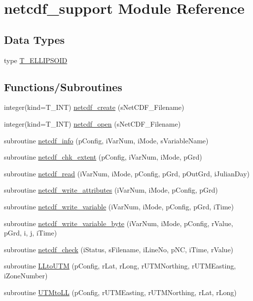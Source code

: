 \hypertarget{namespacenetcdf__support}{
\section{netcdf\_\-support Module Reference}
\label{namespacenetcdf__support}
}
\subsection*{Data Types}
\begin{DoxyCompactItemize}
\item 
type \hyperlink{typenetcdf__support_1_1_t___e_l_l_i_p_s_o_i_d}{T\_\-ELLIPSOID}
\end{DoxyCompactItemize}
\subsection*{Functions/Subroutines}
\begin{DoxyCompactItemize}
\item 
integer(kind=T\_\-INT) \hyperlink{namespacenetcdf__support_a9391bb174b4eadf498d9010f483b0f48}{netcdf\_\-create} (sNetCDF\_\-Filename)
\item 
integer(kind=T\_\-INT) \hyperlink{namespacenetcdf__support_a6eeec6c2df01a48a69ecbafb53b679d7}{netcdf\_\-open} (sNetCDF\_\-Filename)
\item 
subroutine \hyperlink{namespacenetcdf__support_aa89f8e8af31edb7d9f5c0ef77ef23768}{netcdf\_\-info} (pConfig, iVarNum, iMode, sVariableName)
\item 
subroutine \hyperlink{namespacenetcdf__support_adeaa2a22708c9c7348a906103ce38f34}{netcdf\_\-chk\_\-extent} (pConfig, iVarNum, iMode, pGrd)
\item 
subroutine \hyperlink{namespacenetcdf__support_afc78353319d2b16dc631863502467fd6}{netcdf\_\-read} (iVarNum, iMode, pConfig, pGrd, pOutGrd, iJulianDay)
\item 
subroutine \hyperlink{namespacenetcdf__support_aa64a311997b05e100af097459b0e757f}{netcdf\_\-write\_\-attributes} (iVarNum, iMode, pConfig, pGrd)
\item 
subroutine \hyperlink{namespacenetcdf__support_a8a7d46a6ddcdafb7d81472c7dbe3b231}{netcdf\_\-write\_\-variable} (iVarNum, iMode, pConfig, pGrd, iTime)
\item 
subroutine \hyperlink{namespacenetcdf__support_aea9ea475d261fc0de8af0a3d58111d4c}{netcdf\_\-write\_\-variable\_\-byte} (iVarNum, iMode, pConfig, rValue, pGrd, i, j, iTime)
\item 
subroutine \hyperlink{namespacenetcdf__support_a0d68b435588c00e7f5662b237c9bc4bc}{netcdf\_\-check} (iStatus, sFilename, iLineNo, pNC, iTime, rValue)
\item 
subroutine \hyperlink{namespacenetcdf__support_a90eb9a7158a90802c01b032c189ffa0b}{LLtoUTM} (pConfig, rLat, rLong, rUTMNorthing, rUTMEasting, iZoneNumber)
\item 
subroutine \hyperlink{namespacenetcdf__support_a2e192070d8bd34d10591e6de4dbfbce5}{UTMtoLL} (pConfig, rUTMEasting, rUTMNorthing, rLat, rLong)
\end{DoxyCompactItemize}
